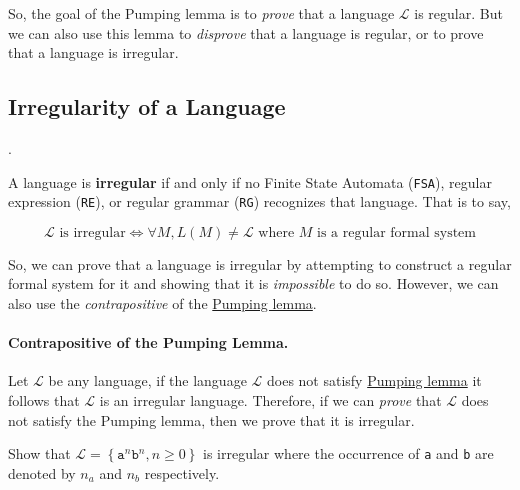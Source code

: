 So, the goal of the Pumping lemma is to \textit{ prove} that a language $\mathcal{L}$ is regular. But we can also use this lemma to \textit{disprove} that a language is regular, or to prove that a language is irregular.

\subsection{Irregularity of a Language}.

A language is \textbf{irregular} if and only if no Finite State Automata (\texttt{FSA}), regular expression (\texttt{RE}), or regular grammar (\texttt{RG}) recognizes that language. That is to say, 

\[
    \mathcal{L} \text{ is irregular} \Longleftrightarrow \forall M, L(M)\neq \mathcal{L} \text{ where $M$ is a regular formal system}
\]

So, we can prove that a language is irregular by attempting to construct a regular formal system for it and showing that it is \textit{impossible} to do so. However, we can also use the \textit{contrapositive} of the \hyperref[pumping_lemma_defn]{Pumping lemma}.

\paragraph{Contrapositive of the Pumping Lemma.}

Let $\mathcal{L}$ be any language, if the language $\mathcal{L}$ does not satisfy \hyperref[pumping_lemma_defn]{Pumping lemma} it follows that $\mathcal{L}$ is an irregular language. Therefore, if we can \textit{prove} that $\mathcal{L}$ does not satisfy the Pumping lemma, then we prove that it is irregular.

\begin{ex}
    Show that $\mathcal{L} = \left\{\texttt{a$^n$b$^n$}, n\geq0\right\}$ is irregular where the occurrence of \texttt{a} and \texttt{b} are denoted by $n_a$ and $n_b$ respectively.
\end{ex}


